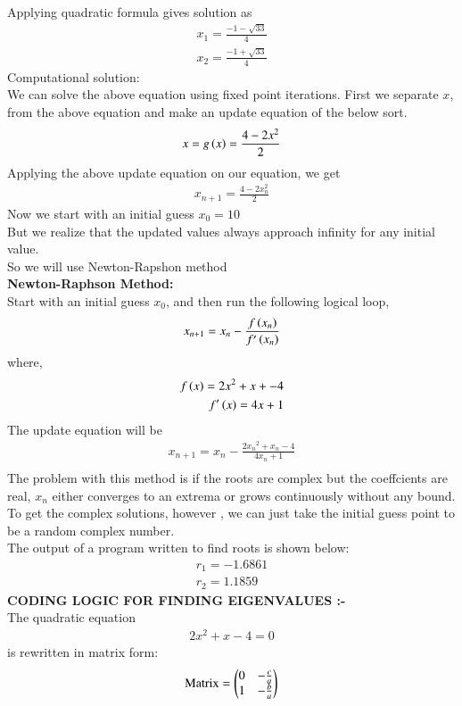 \documentclass[journal]{IEEEtran}
\begin{document}
Applying quadratic formula gives solution as
\begin{align}
	x_1 = \frac{-1-\sqrt{33}}{4}\\
	x_2 = \frac{-1+\sqrt{33}}{4}
\end{align}
Computational solution:\\
We can solve the above equation using fixed point iterations. First we separate $x$, from the above equation and make an update equation of the below sort.
\begin{align}
	x = g\left(x\right) = \frac{4-2x^2}{2}
\end{align}
Applying the above update equation on our equation, we get
\begin{align}
	x_{n+1}=\frac{4-2x^2_n}{2}
\end{align}
Now we start with an initial guess $x_0 = 10 $\\
But we realize that the updated values always approach infinity for any initial value. \\
So we will use Newton-Rapshon method\\
\textbf{Newton-Raphson Method:}\\
Start with an initial guess $x_0$, and then run the following logical loop,
\begin{align}
    x_{n+1} = x_n - \frac{f\left(x_n\right)}{f^{\prime}\left(x_n\right)} 
\end{align}
where,
\begin{align}
    f\left(x\right) = 2x^2 + x + -4\\
    f^{\prime}\left(x\right) = 4x+1
\end{align}
The update equation will be
\begin{align}
	x_{n+1} = x_n - \frac{2{x_n}^2 + x_n - 4}{4x_n+1}\\
\end{align}
The problem with this method is if the roots are complex but the coeffcients are real, $x_n$ either converges to an extrema or grows continuously without any bound.
To get the complex solutions, however , we can just take the initial guess point to be a 
random complex number.\\
The output of a program written to find roots is shown below:
\begin{align}
	r_1 =-1.6861 \\
	r_2 = 1.1859
\end{align}
\textbf{CODING LOGIC FOR FINDING EIGENVALUES :-}\\


The quadratic equation 
\begin{align}
2x^2+x-4=0
\end{align}
is rewritten in matrix form:
\begin{align}
\text{Matrix} =
\begin{pmatrix}0 & -\frac{c}{a} \\
1 & -\frac{b}{a}
\end{pmatrix}
\end{align}
\end{document}
